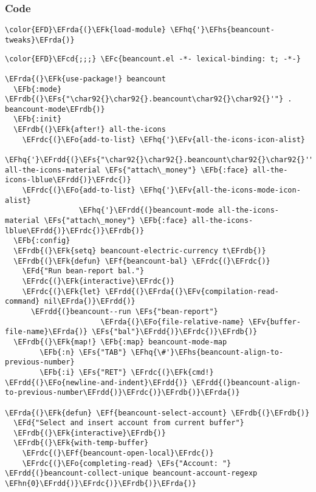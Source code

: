 \documentclass[a4wide,10pt]{article}
\newcommand{\EFc}[1]{\textcolor{EFc}{#1}} %
\newcommand{\EFcd}[1]{\textcolor{EFcd}{#1}} %
\newcommand{\EFs}[1]{\textcolor{EFs}{#1}} %
\newcommand{\EFd}[1]{\textcolor{EFd}{#1}} %
\newcommand{\EFk}[1]{\textcolor{EFk}{#1}} %
\newcommand{\EFb}[1]{\textcolor{EFb}{#1}} %
\newcommand{\EFf}[1]{\textcolor{EFf}{#1}} %
\newcommand{\EFv}[1]{\textcolor{EFv}{#1}} %
\newcommand{\EFo}[1]{\textcolor{EFo}{#1}} %
\newcommand{\EFhn}[1]{\textcolor{EFhn}{\textbf{#1}}} %
\newcommand{\EFhq}[1]{\textcolor{EFhq}{#1}} %
\newcommand{\EFhs}[1]{\textcolor{EFhs}{#1}} %
\newcommand{\EFrda}[1]{\textcolor{EFrda}{#1}} %
\newcommand{\EFrdb}[1]{\textcolor{EFrdb}{#1}} %
\newcommand{\EFrdc}[1]{\textcolor{EFrdc}{#1}} %
\newcommand{\EFrdd}[1]{\textcolor{EFrdd}{#1}} %
\begin{document}
\subsubsection{Code}
\label{sec:org5b9dc07}
\begin{Code}
\begin{Verbatim}
\color{EFD}\EFrda{(}\EFk{load-module} \EFhq{'}\EFhs{beancount-tweaks}\EFrda{)}
\end{Verbatim}
\end{Code}
\begin{Code}
\begin{Verbatim}
\color{EFD}\EFcd{;;;} \EFc{beancount.el -*- lexical-binding: t; -*-}

\EFrda{(}\EFk{use-package!} beancount
  \EFb{:mode} \EFrdb{(}\EFs{"\char92{}\char92{}.beancount\char92{}\char92{}'"} . beancount-mode\EFrdb{)}
  \EFb{:init}
  \EFrdb{(}\EFk{after!} all-the-icons
    \EFrdc{(}\EFo{add-to-list} \EFhq{'}\EFv{all-the-icons-icon-alist}
                 \EFhq{'}\EFrdd{(}\EFs{"\char92{}\char92{}.beancount\char92{}\char92{}'"} all-the-icons-material \EFs{"attach\_money"} \EFb{:face} all-the-icons-lblue\EFrdd{)}\EFrdc{)}
    \EFrdc{(}\EFo{add-to-list} \EFhq{'}\EFv{all-the-icons-mode-icon-alist}
                 \EFhq{'}\EFrdd{(}beancount-mode all-the-icons-material \EFs{"attach\_money"} \EFb{:face} all-the-icons-lblue\EFrdd{)}\EFrdc{)}\EFrdb{)}
  \EFb{:config}
  \EFrdb{(}\EFk{setq} beancount-electric-currency t\EFrdb{)}
  \EFrdb{(}\EFk{defun} \EFf{beancount-bal} \EFrdc{(}\EFrdc{)}
    \EFd{"Run bean-report bal."}
    \EFrdc{(}\EFk{interactive}\EFrdc{)}
    \EFrdc{(}\EFk{let} \EFrdd{(}\EFrda{(}\EFv{compilation-read-command} nil\EFrda{)}\EFrdd{)}
      \EFrdd{(}beancount--run \EFs{"bean-report"}
                      \EFrda{(}\EFo{file-relative-name} \EFv{buffer-file-name}\EFrda{)} \EFs{"bal"}\EFrdd{)}\EFrdc{)}\EFrdb{)}
  \EFrdb{(}\EFk{map!} \EFb{:map} beancount-mode-map
        \EFb{:n} \EFs{"TAB"} \EFhq{\#'}\EFhs{beancount-align-to-previous-number}
        \EFb{:i} \EFs{"RET"} \EFrdc{(}\EFk{cmd!} \EFrdd{(}\EFo{newline-and-indent}\EFrdd{)} \EFrdd{(}beancount-align-to-previous-number\EFrdd{)}\EFrdc{)}\EFrdb{)}\EFrda{)}

\EFrda{(}\EFk{defun} \EFf{beancount-select-account} \EFrdb{(}\EFrdb{)}
  \EFd{"Select and insert account from current buffer"}
  \EFrdb{(}\EFk{interactive}\EFrdb{)}
  \EFrdb{(}\EFk{with-temp-buffer}
    \EFrdc{(}\EFf{beancount-open-local}\EFrdc{)}
    \EFrdc{(}\EFo{completing-read} \EFs{"Account: "} \EFrdd{(}beancount-collect-unique beancount-account-regexp \EFhn{0}\EFrdd{)}\EFrdc{)}\EFrdb{)}\EFrda{)}


\end{Verbatim}
\end{Code}
\end{document}
